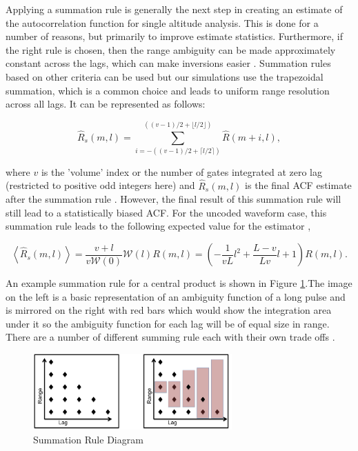Applying a summation rule is generally the next step in creating an estimate of the autocorrelation function for single altitude analysis. This is done for a number of reasons, but primarily to improve estimate statistics.  Furthermore, if the right rule is chosen, then the range ambiguity can be made approximately constant across the lags, which can make inversions easier \cite{nygren1996}. Summation rules based on other criteria can be used but our simulations use the trapezoidal summation, which is a common choice and leads to uniform range resolution across all lags. It can be represented as follows:

\begin{equation}
\label{eq:sumrule}
\widehat{R}_s(m,l) = \displaystyle\sum\limits_{i=-((v-1)/2+\lceil l/2 \rceil)}^{((v-1)/2+\lfloor l/2\rfloor)} \widehat{R}(m+i,l),
\end{equation}

\noindent where $v$ is the 'volume' index or the number of gates integrated at zero lag (restricted to positive odd integers here) and $\widehat{R}_s(m,l)$ is the final ACF estimate after the summation rule \cite{nygren1996}. 
However, the final result of this summation rule will still lead to a statistically biased ACF. For the uncoded waveform case, this summation rule leads to the following expected value for the estimator \cite{nygren1996},

\begin{equation}
\label{eq:sumruleest}
\left\langle\widehat{R}_s(m,l) \right\rangle  =\frac{v+l}{v\mathcal{W}(0)}\mathcal{W}(l)R(m,l) =\left(-\frac{1}{vL}l^2+\frac{L-v}{Lv}l+1\right)   R(m,l).
\end{equation}

An example summation rule for a central product is shown in Figure \ref{fig:sumrule}.The image on the left is a basic representation of an ambiguity function of a long pulse and is mirrored on the right with red bars which would show the integration area under it so the ambiguity function for each lag will be of equal size in range. There are a number of different summing rule each with their own trade offs \cite{nygren1996}.

\begin{figure}[!t]
\centering
\includegraphics[width=3in]{sumrule}
\caption{Summation Rule Diagram}
\label{fig:sumrule}
\end{figure}

